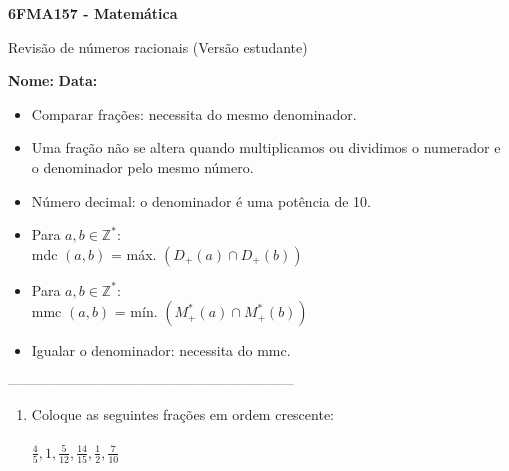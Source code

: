 \documentclass[a4paper,14pt]{article}
\begin{document}
	
	\noindent\textbf{6FMA157 - Matemática} 
	
	\begin{center}Revisão de números racionais (Versão estudante)
	\end{center}
	
	\noindent\textbf{Nome:} \underline{\hspace{10cm}}
	\noindent\textbf{Data:} \underline{\hspace{4cm}}
	
	
	\begin{multicols}{2}
	    \noindent \begin{itemize}
	    	\item Comparar frações: necessita do mesmo denominador.
	    	\item Uma fração não se altera quando multiplicamos ou dividimos o numerador e o denominador pelo mesmo número.
	    	\item Número decimal: o denominador é uma potência de 10.
	    	\item Para $a, b \in \mathbb{Z}^*$: \\
	    	\small mdc $(a, b)$ = máx. $(D_+ (a) \cap D_+ (b))$
	    	\normalsize \item Para $a, b \in \mathbb{Z}^*$: \\
	    	\small mmc $(a, b)$ = mín. $(M_+^* (a) \cap M_+^* (b))$
	    	\normalsize \item Igualar o denominador: necessita do mmc.
	    \end{itemize}
		\noindent\textsubscript{--------------------------------------------------------------------------}
		\begin{enumerate} 
			\item Coloque as seguintes frações em ordem crescente: \\\\
			$\frac{4}{5}, 1, \frac{5}{12}, \frac{14}{15}, \frac{1}{2}, \frac{7}{10}$ \\\\\\\\\\\\\\\\\\\\

\end{enumerate}
\end{multicols}
\end{document}
